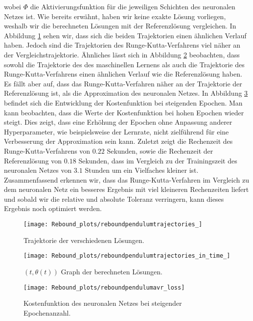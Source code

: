 wobei $\Phi$ die Aktivierungsfunktion für die jeweiligen Schichten des neuronalen Netzes ist. Wie bereits erwähnt, haben
wir keine exakte Lösung vorliegen, weshalb wir die berechneten Lösungen mit der Referenzlösung vergleichen.
In Abbildung \ref{fig:rebound-trajectories} sehen wir, dass sich die beiden Trajektorien einen ähnlichen
Verlauf haben. Jedoch sind die Trajektorien des Runge-Kutta-Verfahrens viel näher an der Vergleichstrajektorie.
Ähnliches lässt sich in Abbildung \ref{fig:rebound-trajectories-in-time} beobachten, dass sowohl die Trajektorie des
des maschinellen Lernens als auch die Trajektorie des Runge-Kutta-Verfahrens einen ähnlichen Verlauf wie die
Referenzlösung haben. Es fällt aber auf, dass das Runge-Kutta-Verfahren näher an der Trajektorie der Referenzlösung ist,
als die Approximation des neuronalen Netzes. In Abbildung \ref{fig:rebound-loss} befindet sich die Entwicklung der
Kostenfunktion bei steigenden Epochen. Man kann beobachten, dass die Werte der Kostenfunktion bei hohen Epochen wieder
steigt. Dies zeigt, dass eine Erhöhung der Epochen ohne Anpassung anderer Hyperparameter, wie beispielsweise der
Lernrate, nicht zielführend für eine Verbesserung der Approximation sein kann. Zuletzt zeigt die Rechenzeit des
Runge-Kutta-Verfahrens von $0.22$ Sekunden, sowie die Rechenzeit der Referenzlösung von $0.18$ Sekunden, dass im
Vergleich zu der Trainingszeit des neuronalen Netzes von $3.1$ Stunden um ein Vielfaches kleiner ist. Zusammenfassend
erkennen wir, dass das Runge-Kutta-Verfahren im Vergleich zu dem neuronalen Netz ein besseres Ergebnis mit viel
kleineren Rechenzeiten liefert und sobald wir die relative und absolute Toleranz verringern, kann dieses Ergebnis noch
optimiert werden.
\begin{figure}
       \centering
       \texttt{[image: Rebound\_plots/reboundpendulumtrajectories\_]}
       \caption{Trajektorie der verschiedenen Lösungen.}
       \label{fig:rebound-trajectories}
\end{figure}
\begin{figure}
       \centering
       \texttt{[image: Rebound\_plots/reboundpendulumtrajectories\_in\_time\_]}
       \caption{$(t, \theta(t))$ Graph der berechneten Lösungen.}
       \label{fig:rebound-trajectories-in-time}
\end{figure}
\begin{figure}
       \centering
       \texttt{[image: Rebound\_plots/reboundpendulumavr\_loss]}
       \caption{Kostenfunktion des neuronalen Netzes bei steigender Epochenanzahl.}
       \label{fig:rebound-loss}
\end{figure}

